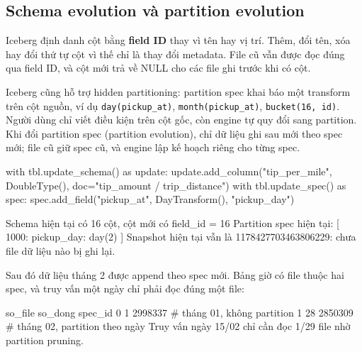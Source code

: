 \documentclass[12pt]{article}
\begin{document}
\subsection{Schema evolution và partition evolution}

Iceberg định danh cột bằng \textbf{field ID} thay vì tên hay vị trí. Thêm, đổi tên, xóa hay đổi thứ tự cột vì thế chỉ là thay đổi metadata. File cũ vẫn được đọc đúng qua field ID, và cột mới trả về NULL cho các file ghi trước khi có cột.

Iceberg cũng hỗ trợ hidden partitioning: partition spec khai báo một transform trên cột nguồn, ví dụ \texttt{day(pickup\_at)}, \texttt{month(pickup\_at)}, \texttt{bucket(16, id)}. Người dùng chỉ viết điều kiện trên cột gốc, còn engine tự quy đổi sang partition. Khi đổi partition spec (partition evolution), chỉ dữ liệu ghi sau mới theo spec mới; file cũ giữ spec cũ, và engine lập kế hoạch riêng cho từng spec.

\begin{aivncodebox}
\begin{python}
with tbl.update_schema() as update:
    update.add_column("tip_per_mile", DoubleType(), doc="tip_amount / trip_distance")
with tbl.update_spec() as spec:
    spec.add_field("pickup_at", DayTransform(), "pickup_day")
\end{python}
\end{aivncodebox}

\begin{aivnCodeOutput}[Output]
\begin{python}
Schema hiện tại có 16 cột, cột mới có field_id = 16
Partition spec hiện tại: [
  1000: pickup_day: day(2)
]
Snapshot hiện tại vẫn là 1178427703463806229: chưa file dữ liệu nào bị ghi lại.
\end{python}
\end{aivnCodeOutput}

Sau đó dữ liệu tháng 2 được append theo spec mới. Bảng giờ có file thuộc hai spec, và truy vấn một ngày chỉ phải đọc đúng một file:

\begin{aivnCodeOutput}
\begin{python}
         so_file  so_dong
spec_id
0              1  2998337     # tháng 01, không partition
1             28  2850309     # tháng 02, partition theo ngày
Truy vấn ngày 15/02 chỉ cần đọc 1/29 file nhờ partition pruning.
\end{python}
\end{aivnCodeOutput}
\end{document}
